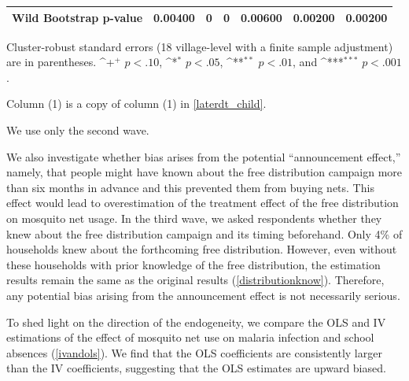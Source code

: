 \documentclass[fleqn,11pt]{article}
\newcommand{\sym}[1]{\rlap{$#1$}}
\def\sym#1{\ifmmode^{#1}\else\(^{#1}\)\fi
}
\begin{document}
\begin{table}[h]
\begin{threeparttable}
\begin{tabular}{l*{6}{c}}
Wild Bootstrap p-value &     0.00400         &           0         &           0         &     0.00600         &     0.00200         &     0.00200         \\
\hline\hline
\end{tabular}
\begin{tablenotes}
\item Cluster-robust standard errors (18 village-level with a finite sample adjustment) are in parentheses. \sym{+} \(p<.10\), \sym{*} \(p<.05\), \sym{**} \(p<.01\), and \sym{***} \(p<.001\). 
\item Column (1) is a copy of column (1) in \autoref{laterdt_child}.
\item We use only the second wave.
\end{tablenotes}
\end{threeparttable}
\end{table}



We also investigate whether bias arises from the potential ``announcement effect,'' namely, that people might have known about the free distribution campaign more than six months in advance and this prevented them from buying nets. This effect would lead to overestimation of the treatment effect of the free distribution on mosquito net usage. In the third wave, we asked respondents whether they knew about the free distribution campaign and its timing beforehand. Only 4\% of households knew about the forthcoming free distribution. However, even without these households with prior knowledge of the free distribution, the estimation results remain the same as the original results (\autoref{distributionknow}). Therefore, any potential bias arising from the announcement effect is not necessarily serious.

To shed light on the direction of the endogeneity, we compare the OLS and IV estimations of the effect of mosquito net use on malaria infection and school absences (\autoref{ivandols}). We find that the OLS coefficients are consistently larger than the IV coefficients, suggesting that the OLS estimates are upward biased.

\end{document}
